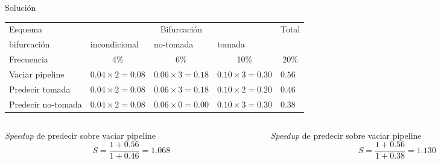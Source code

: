 \begin{frame}[t]{Solución}

{\scriptsize
\begin{tabular}[c]{|p{}|*{3}{p{}|}p{}|}
\hline
Esquema &  \multicolumn{3}{c|}{Bifurcación} & \multicolumn{1}{c|}{Total}
\\
\cline{2-4}
bifurcación & incondicional & no-tomada & tomada &
\\
\hline\hline

Frecuencia &
\multicolumn{1}{c|}{4\%} &
\multicolumn{1}{c|}{6\%} &
\multicolumn{1}{c|}{10\%} &
\multicolumn{1}{c|}{20\%} 
\\
\hline

Vaciar pipeline &
$0.04 \times 2 = 0.08$ &
$0.06 \times 3 = 0.18$ &
$0.10 \times 3 = 0.30$ &
$0.56$
\\
\hline

Predecir tomada &
$0.04 \times 2 = 0.08$ &
$0.06 \times 3 = 0.18$ &
$0.10 \times 2 = 0.20$ &
$0.46$
\\
\hline

Predecir no-tomada &
$0.04 \times 2 = 0.08$ &
$0.06 \times 0 = 0.00$ &
$0.10 \times 3 = 0.30$ &
$0.38$
\\
\hline

\hline
\end{tabular}
}
\begin{center}
\end{center}

\begin{columns}

\begin{column}{.49\textwidth}
{\footnotesize
\emph{Speedup} de predecir  sobre vaciar pipeline
}
\begin{displaymath}
S =
\frac{1 + 0.56}{1 + 0.46} =
1.068
\end{displaymath}
\end{column}

\begin{column}{.49\textwidth}
{\footnotesize
\emph{Speedup} de predecir  sobre vaciar pipeline
}
\begin{displaymath}
S =
\frac{1 + 0.56}{1 + 0.38} =
1.130
\end{displaymath}
\end{column}

\end{columns}

\end{frame}
